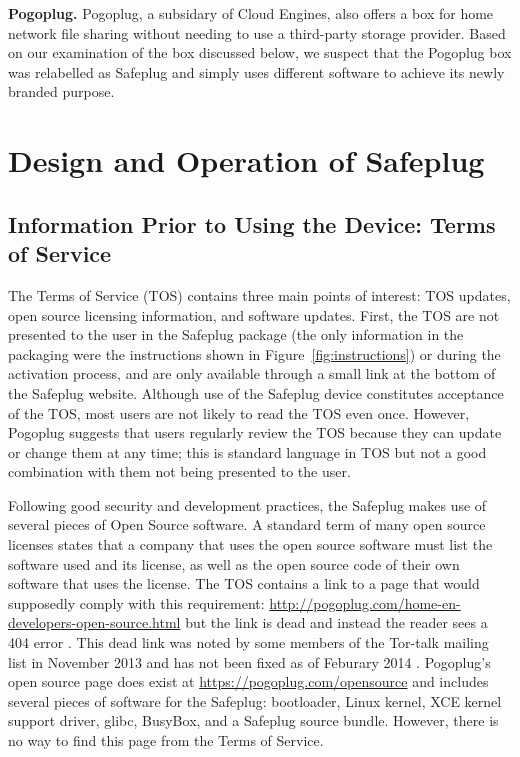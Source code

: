 \documentclass[conference]{IEEEtran}
\begin{document}
{\bf Pogoplug.} Pogoplug, a subsidary of Cloud Engines, also offers a box for home network file sharing without needing to use a third-party storage provider.  Based on our examination of the box discussed below, we suspect that the Pogoplug box was relabelled as Safeplug and simply uses different software to achieve its newly branded purpose.

\section{Design and Operation of Safeplug}

\subsection{Information Prior to Using the Device: Terms of Service}
\label{tos}
The Terms of Service (TOS) contains three main points of interest: TOS updates, open source licensing information, and software updates.  First, the TOS are not presented to the user in the Safeplug package (the only information in the packaging were the instructions shown in Figure~\ref{fig:instructions}) or during the activation process, and are only available through a small link at the bottom of the Safeplug website\cite{safeplug}.  Although use of the Safeplug device constitutes acceptance of the TOS, most users are not likely to read the TOS even once.  However, Pogoplug suggests that users regularly review the TOS because they can update or change them at any time; this is standard language in TOS but not a good combination with them not being presented to the user.

Following good security and development practices, the Safeplug makes use of several pieces of Open Source software.  A standard term of many open source licenses states that a company that uses the open source software must list the software used and its license, as well as the open source code of their own software that uses the license.  The TOS contains a link to a page that would supposedly comply with this requirement: \url{http://pogoplug.com/home-en-developers-open-source.html} but the link is dead and instead the reader sees a 404 error \cite{safeplug}.  This dead link was noted by some members of the Tor-talk mailing list in November 2013 and has not been fixed as of Feburary 2014 \cite{tormailinglist}.  Pogoplug's open source page does exist at \url{https://pogoplug.com/opensource} and includes several pieces of software for the Safeplug: bootloader, Linux kernel, XCE kernel support driver, glibc, BusyBox, and a Safeplug source bundle.  However, there is no way to find this page from the Terms of Service.
\end{document}
